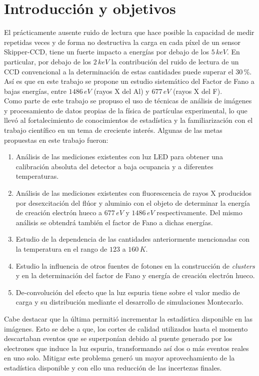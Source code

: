 
\chapter{Introducción y objetivos}
\noindent El prácticamente ausente ruido de lectura que hace posible la capacidad de medir repetidas veces y de forma no destructiva la carga en cada píxel de un sensor Skipper-CCD, tiene un fuerte impacto a energías por debajo de los $5\,\si{keV}$. En particular, por debajo de los $2\,\si{keV}$ la contribución del ruido de lectura de un CCD convencional a la determinación de estas cantidades puede superar el $30\,\%$. Así es que en este trabajo se propone un estudio sistemático del Factor de Fano a bajas energías, entre $1486\,\si{eV}$ (rayos X del Al) y $677\,\si{eV}$ (rayos X del F).\\
\indent Como parte de este trabajo se propuso el uso de técnicas de análisis de imágenes y procesamiento de datos propias de la física de partículas experimental, lo que llevó al fortalecimiento de conocimientos de estadística y la familiarización con el trabajo científico en un tema de creciente interés. 
Algunas de las metas propuestas en este trabajo fueron:
\begin{enumerate}
    \item Análisis de las mediciones existentes con luz LED para obtener una calibración absoluta del detector a baja ocupancia y a diferentes temperaturas.
    \item Análisis de las mediciones existentes con fluorescencia de rayos X producidos por desexcitación del flúor y aluminio con el objeto de determinar la energía de creación electrón hueco a $677\,\si{eV}$ y $1486\,\si{eV}$ respectivamente. Del mismo análisis se obtendrá también el factor de Fano a dichas energías.
    \item Estudio de la dependencia de las cantidades anteriormente mencionadas con la temperatura en el rango de $123$ a $160\,K$.
    \item Estudio la influencia de otros fuentes de fotones en la construcción de \textit{clusters} y en la determinación del factor de Fano y energía de creación electrón hueco.
    \item De-convolución del efecto que la luz espuria tiene sobre el valor medio de carga y su distribución mediante el desarrollo de simulaciones Montecarlo.
\end{enumerate}
Cabe destacar que la última permitió incrementar la estadística disponible en las imágenes. Esto se debe a que, los cortes de calidad utilizados hasta el momento descartaban eventos que se superponían debido al puente generado por los electrones que induce la luz espuria, transformando así dos o más eventos reales en uno solo. Mitigar este problema generó un mayor aprovechamiento de la estadística disponible y con ello una reducción de las incertezas finales.

